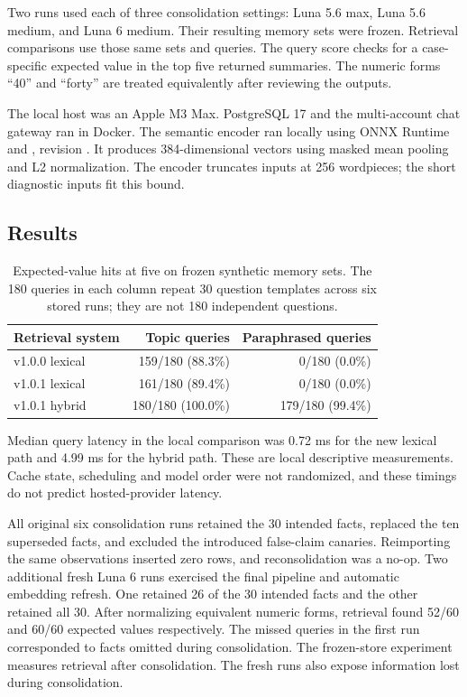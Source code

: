 \documentclass[11pt]{article}
\begin{document}
Two runs used each of three consolidation settings: Luna 5.6 max, Luna 5.6 medium, and Luna 6 medium. Their resulting memory sets were frozen. Retrieval comparisons use those same sets and queries. The query score checks for a case-specific expected value in the top five returned summaries. The numeric forms ``40'' and ``forty'' are treated equivalently after reviewing the outputs.

The local host was an Apple M3 Max. PostgreSQL 17 and the multi-account chat gateway ran in Docker. The semantic encoder ran locally using ONNX Runtime and , revision . It produces 384-dimensional vectors using masked mean pooling and L2 normalization. The encoder truncates inputs at 256 wordpieces; the short diagnostic inputs fit this bound.

\subsection{Results}
\begin{table}[h]
\centering
\begin{tabular}{lrr}
\toprule
Retrieval system & Topic queries & Paraphrased queries\\
\midrule
v1.0.0 lexical & 159/180 (88.3\%) & 0/180 (0.0\%)\\
v1.0.1 lexical & 161/180 (89.4\%) & 0/180 (0.0\%)\\
v1.0.1 hybrid & 180/180 (100.0\%) & 179/180 (99.4\%)\\
\bottomrule
\end{tabular}
\caption{Expected-value hits at five on frozen synthetic memory sets. The 180 queries in each column repeat 30 question templates across six stored runs; they are not 180 independent questions.}
\end{table}

Median query latency in the local comparison was 0.72 ms for the new lexical path and 4.99 ms for the hybrid path. These are local descriptive measurements. Cache state, scheduling and model order were not randomized, and these timings do not predict hosted-provider latency.

All original six consolidation runs retained the 30 intended facts, replaced the ten superseded facts, and excluded the introduced false-claim canaries. Reimporting the same observations inserted zero rows, and reconsolidation was a no-op. Two additional fresh Luna 6 runs exercised the final pipeline and automatic embedding refresh. One retained 26 of the 30 intended facts and the other retained all 30. After normalizing equivalent numeric forms, retrieval found 52/60 and 60/60 expected values respectively. The missed queries in the first run corresponded to facts omitted during consolidation. The frozen-store experiment measures retrieval after consolidation. The fresh runs also expose information lost during consolidation.
\end{document}
